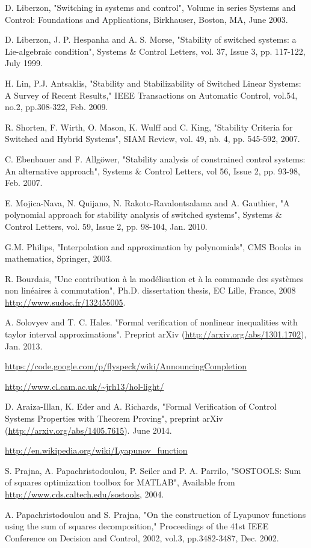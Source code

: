 \documentclass[12pt]{article}
\begin{document}
\begin{thebibliography}{}



 D. Liberzon, "Switching in systems and control", Volume in series Systems and Control: Foundations and Applications, Birkhauser, Boston, MA, June 2003.

 D. Liberzon, J. P. Hespanha and A. S. Morse, "Stability of switched systems: a Lie-algebraic condition", Systems $\&$ Control Letters, 
vol. 37, Issue 3, pp. 117-122, July 1999.


 H. Lin, P.J. Antsaklis, "Stability and Stabilizability of Switched Linear Systems: A Survey of Recent Results," IEEE Transactions on Automatic Control,
vol.54, no.2, pp.308-322, Feb. 2009.

 R. Shorten, F. Wirth, O. Mason, K. Wulff and C. King, "Stability Criteria for Switched and Hybrid Systems", SIAM Review, vol. 49, nb. 4, pp. 545-592, 2007.


 C. Ebenbauer and F. Allgöwer, "Stability analysis of constrained control systems: An alternative approach", Systems \& Control Letters, vol 56, 
Issue 2, pp. 93-98, Feb. 2007.

 E. Mojica-Nava, N. Quijano, N. Rakoto-Ravalontsalama and A. Gauthier, "A polynomial approach for stability analysis of switched systems", Systems \& Control Letters, 
vol. 59, Issue 2, pp. 98-104, Jan. 2010. 

 G.M. Philips, "Interpolation and approximation by polynomials", CMS Books in mathematics, Springer, 2003.

 R. Bourdais, "Une contribution \`a la mod\'elisation et \`a la commande des systèmes non lin\'eaires \`a commutation", Ph.D. dissertation thesis, EC Lille, France, 2008 
\url{http://www.sudoc.fr/132455005}.

 A. Solovyev and T. C. Hales. "Formal verification of nonlinear inequalities with taylor interval approximations". Preprint arXiv 
(\url{http://arxiv.org/abs/1301.1702}), Jan. 2013.

 \url{https://code.google.com/p/flyspeck/wiki/AnnouncingCompletion}

 \url{http://www.cl.cam.ac.uk/~jrh13/hol-light/}

 D. Araiza-Illan, K. Eder and A. Richards, "Formal Verification of Control Systems Properties with Theorem Proving", 
preprint arXiv (\url{http://arxiv.org/abs/1405.7615}). June 2014.

 \url{http://en.wikipedia.org/wiki/Lyapunov_function}


  S. Prajna, A. Papachristodoulou, P. Seiler and P. A. Parrilo, "{SOSTOOLS}: Sum of squares optimization toolbox for {MATLAB}", Available from \url{http://www.cds.caltech.edu/sostools}, {2004}.


 A. Papachristodoulou and S. Prajna, "On the construction of Lyapunov functions using the sum of squares decomposition," Proceedings of 
the 41st IEEE Conference on Decision and Control, 2002, vol.3, pp.3482-3487, Dec. 2002.

\end{thebibliography}
\end{document}
